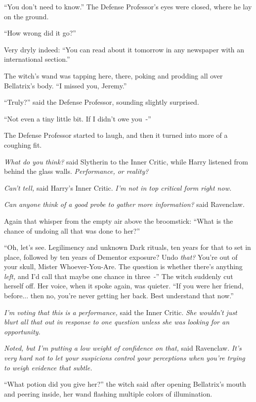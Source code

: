 ``You don't need to know.'' The Defense Professor's eyes were closed, where he lay on the ground.

``How wrong did it go?''

Very dryly indeed: ``You can read about it tomorrow in any newspaper with an international section.''

The witch's wand was tapping here, there, poking and prodding all over Bellatrix's body. ``I missed you, Jeremy.''

``Truly?'' said the Defense Professor, sounding slightly surprised.

``Not even a tiny little bit. If I didn't owe you~-''

The Defense Professor started to laugh, and then it turned into more of a coughing fit.

\emph{What do you think?} said Slytherin to the Inner Critic, while Harry listened from behind the glass walls. \emph{Performance, or reality?}

\emph{Can't tell,} said Harry's Inner Critic. \emph{I'm not in top critical form right now.}

\emph{Can anyone think of a good probe to gather more information?} said Ravenclaw.

Again that whisper from the empty air above the broomstick: ``What is the chance of undoing all that was done to her?''

``Oh, let's see. Legilimency and unknown Dark rituals, ten years for that to set in place, followed by ten years of Dementor exposure? Undo \emph{that?} You're out of your skull, Mister Whoever-You-Are. The question is whether there's anything \emph{left,} and I'd call that maybe one chance in three~-'' The witch suddenly cut herself off. Her voice, when it spoke again, was quieter. ``If you were her friend, before... then no, you're never getting her back. Best understand that now.''

\emph{I'm voting that this is a performance,} said the Inner Critic. \emph{She wouldn't just blurt all that out in response to one question unless she was looking for an opportunity.}

\emph{Noted, but I'm putting a low weight of confidence on that,} said Ravenclaw. \emph{It's very hard not to let your suspicions control your perceptions when you're trying to weigh evidence that subtle.}

``What potion did you give her?'' the witch said after opening Bellatrix's mouth and peering inside, her wand flashing multiple colors of illumination.

